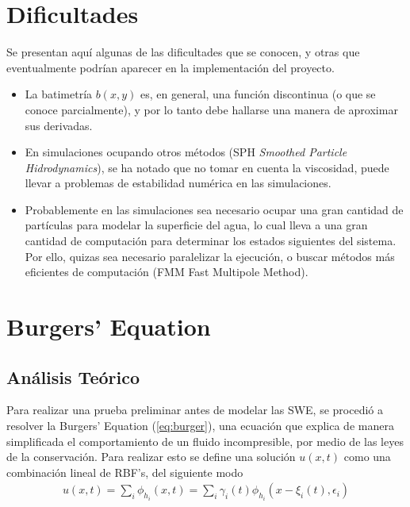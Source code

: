 \documentclass[spanish]{article}
\begin{document}
\section{Dificultades}
Se presentan aquí algunas de las dificultades que se conocen, y otras que eventualmente podrían aparecer en la implementación 
del proyecto.
\begin{itemize}
	\item La batimetría $b(x,y)$ es, en general, una función discontinua (o que se conoce parcialmente), y por lo tanto 
	debe hallarse una manera de aproximar sus derivadas.
	\item En simulaciones ocupando otros métodos (SPH \textit{Smoothed Particle Hidrodynamics}), se ha notado que no tomar 
	en cuenta la viscosidad, puede llevar a problemas de estabilidad numérica en las simulaciones.
	\item Probablemente en las simulaciones sea necesario ocupar una gran cantidad de partículas para modelar la superficie
	del agua, lo cual lleva a una gran cantidad de computación para determinar los estados siguientes del sistema. Por ello,
	quizas sea necesario paralelizar la ejecución, o buscar métodos más eficientes de computación (FMM Fast Multipole 
	Method).
\end{itemize}                                                                                                                                                                                                                                                                                                                                                                                                     
\newpage  
\section{Burgers' Equation}
  \subsection{Análisis Teórico}
    Para realizar una prueba preliminar antes de modelar las SWE, se procedió a resolver la Burgers' Equation (\ref{eq:burger}), una ecuación que explica de manera simplificada el comportamiento de un fluido incompresible, por medio de las leyes de la conservación. Para realizar esto se define una solución $u(x,t)$ como una combinación lineal de RBF's, del siguiente modo
    \begin{align}
      u(x,t) = \sum_{i} \phi_{h_i}(x,t) = \sum_i \gamma_i(t)\phi_{h_i}(x-\xi_i(t),\epsilon_i)
    \end{align}
    
\end{document}
